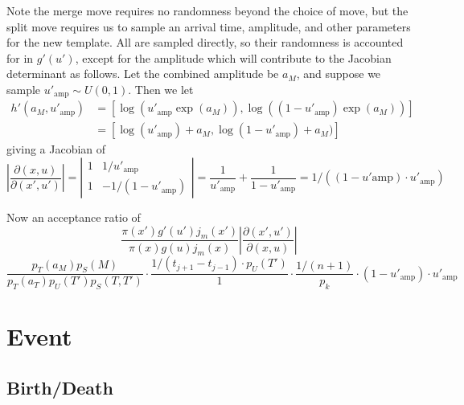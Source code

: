\documentclass{article}
\begin{document}
Note the merge move requires no randomness beyond the choice of move, but the split move requires us to sample an arrival time, amplitude, and other parameters for the new template. All are sampled directly, so their randomness is accounted for in $g'(u')$, except for the amplitude which will contribute to the Jacobian determinant as follows. Let the combined amplitude be $a_M$, and suppose we sample $u'_\text{amp} \sim U(0,1)$. Then we let
\begin{align*}
h'(a_M, u'_\text{amp}) &= [\log( u'_\text{amp} \exp(a_M)), \log((1-u'_\text{amp}) \exp(a_M)) ] \\
&=  [\log( u'_\text{amp}) + a_M, \log(1-u'_\text{amp}) + a_M)]\end{align*}
giving a Jacobian of
\[\left|\frac{\partial(x, u)}{\partial(x',u')}\right| = \left|\begin{array}{cc} 1 & 1/u'_\text{amp}\\1 & -1/(1-u'_\text{amp})\end{array}\right| = \frac{1}{u'_\text{amp}} + \frac{1}{1-u'_\text{amp}} = 1/\left((1-u'\text{amp})\cdot u'_\text{amp} \right)\]

Now an acceptance ratio of 
\[\frac{\pi(x')g'(u')j_m(x')}{\pi(x)g(u)j_m(x)}\left|\frac{\partial(x', u')}{\partial(x,u)}\right|\]
\[\frac{p_T(a_M)p_S(M)}{p_T(a_T)p_U(T')p_S(T, T')} \cdot \frac{1/(t_{j+1} - t_{j-1}) \cdot p_U(T') } {1} \cdot \frac{1/(n+1)}{p_k} \cdot (1-u'_\text{amp})\cdot u'_\text{amp}\]


\section{Event}

\subsection{Birth/Death}
\end{document}
